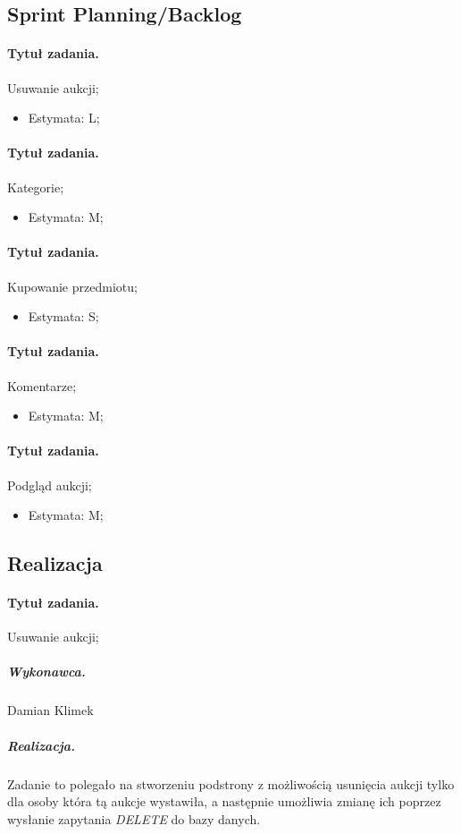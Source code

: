 \documentclass[a4paper]{article}
\begin{document}
	\subsection{Sprint Planning/Backlog}
	
	\paragraph{Tytuł zadania.} Usuwanie aukcji;
	\begin{itemize}
		\item Estymata: L;
	\end{itemize}
	
	\paragraph{Tytuł zadania.} Kategorie;
	\begin{itemize}
		\item Estymata: M;
	\end{itemize}
	
	\paragraph{Tytuł zadania.} Kupowanie przedmiotu;
	\begin{itemize}
		\item Estymata: S;
	\end{itemize}
	
	\paragraph{Tytuł zadania.} Komentarze;
	\begin{itemize}
		\item Estymata: M;
	\end{itemize}
	
	\paragraph{Tytuł zadania.} Podgląd aukcji;
	\begin{itemize}
		\item Estymata: M;
	\end{itemize}
	
	\subsection{Realizacja}	
	
	\paragraph{Tytuł zadania.} Usuwanie aukcji;
	\subparagraph{Wykonawca.} Damian Klimek
	\subparagraph{Realizacja.} Zadanie to polegało na stworzeniu podstrony z możliwością usunięcia aukcji tylko dla osoby która tą aukcje wystawiła, a następnie umożliwia zmianę ich poprzez wysłanie zapytania \emph{DELETE} do bazy danych.
	
\end{document}
